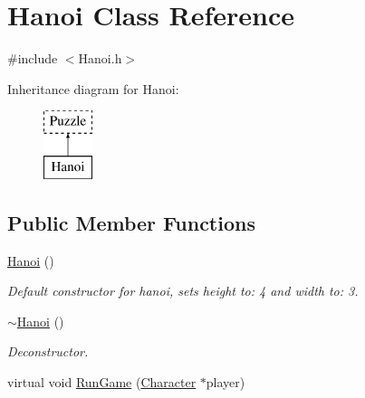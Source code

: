 \hypertarget{classHanoi}{\section{Hanoi Class Reference}
\label{classHanoi}
}


{\ttfamily \#include $<$Hanoi.\-h$>$}

Inheritance diagram for Hanoi\-:\begin{figure}[H]
\begin{center}
\leavevmode
\includegraphics[height=2.000000cm]{classHanoi}
\end{center}
\end{figure}
\subsection*{Public Member Functions}
\begin{DoxyCompactItemize}
\item 
\hyperlink{classHanoi_a2af453ec21277f20edc002be08f22346}{Hanoi} ()
\begin{DoxyCompactList}\small\item\em Default constructor for hanoi, sets height to\-: 4 and width to\-: 3. \end{DoxyCompactList}\item 
\hyperlink{classHanoi_a59760291bfeda65330ff53c429a4e55b}{$\sim$\-Hanoi} ()
\begin{DoxyCompactList}\small\item\em Deconstructor. \end{DoxyCompactList}\item 
virtual void \hyperlink{classHanoi_a294a2a533b7f3305391aa880f7a0eb36}{Run\-Game} (\hyperlink{classCharacter}{Character} $\ast$player)
\end{DoxyCompactItemize}
